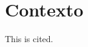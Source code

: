 \section{Contexto}\label{section:context}

\lipsum[1]

This is cited\cite{einstein}\cite{dirac}\cite{knuthwebsite}\cite{knuth-fa}\cite{knuth-acp}\cite{ctan}.
